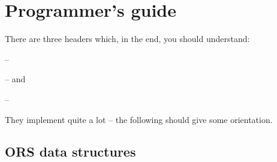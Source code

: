 \section{Programmer's guide}

There are three headers which, in the end, you should understand:

-- 

--  and 

-- 

They implement quite a lot -- the following should give some
orientation.

\subsection{ORS data structures}

